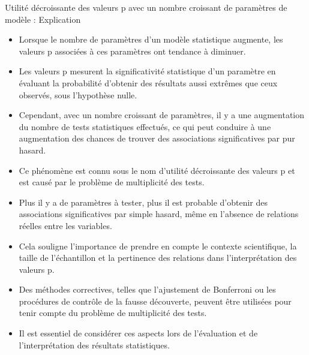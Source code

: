 \documentclass{beamer}
\begin{document}
\begin{frame}{Utilité décroissante des valeurs p avec un nombre croissant de paramètres de modèle : Explication}
	\begin{itemize}
		\item Lorsque le nombre de paramètres d'un modèle statistique augmente, les valeurs p associées à ces paramètres ont tendance à diminuer.
		\item Les valeurs p mesurent la significativité statistique d'un paramètre en évaluant la probabilité d'obtenir des résultats aussi extrêmes que ceux observés, sous l'hypothèse nulle.
		\item Cependant, avec un nombre croissant de paramètres, il y a une augmentation du nombre de tests statistiques effectués, ce qui peut conduire à une augmentation des chances de trouver des associations significatives par pur hasard.
		\item Ce phénomène est connu sous le nom d'utilité décroissante des valeurs p et est causé par le problème de multiplicité des tests.
		\item Plus il y a de paramètres à tester, plus il est probable d'obtenir des associations significatives par simple hasard, même en l'absence de relations réelles entre les variables.
		\item Cela souligne l'importance de prendre en compte le contexte scientifique, la taille de l'échantillon et la pertinence des relations dans l'interprétation des valeurs p.
		\item Des méthodes correctives, telles que l'ajustement de Bonferroni ou les procédures de contrôle de la fausse découverte, peuvent être utilisées pour tenir compte du problème de multiplicité des tests.
		\item Il est essentiel de considérer ces aspects lors de l'évaluation et de l'interprétation des résultats statistiques.
	\end{itemize}
\end{frame}
\end{document}

